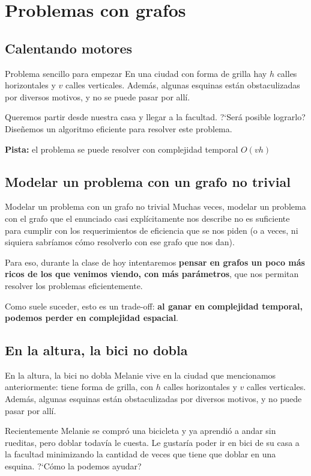 \documentclass[compress]{beamer}
\begin{document}
\section{Problemas con grafos}
\subsection{Calentando motores}
\begin{frame}{Problema sencillo para empezar}
En una ciudad con forma de grilla hay $h$ calles horizontales y $v$ calles verticales. Adem\'as, algunas esquinas est\'an obstaculizadas por diversos motivos, y no se puede pasar por all\'i.\bigskip

Queremos partir desde nuestra casa y llegar a la facultad. ?`Ser\'a posible lograrlo? \\ Dise\~nemos un algoritmo eficiente para resolver este problema. \bigskip

{\bf Pista:} el problema se puede resolver con complejidad temporal $O(v h)$

\end{frame}

\subsection{Modelar un problema con un grafo no trivial}
\begin{frame}{Modelar un problema con un grafo no trivial}
Muchas veces, modelar un problema con el grafo que el enunciado casi expl\'icitamente nos describe no es suficiente para cumplir con los requerimientos de eficiencia que se nos piden (o a veces, ni siquiera sabr\'iamos c\'omo resolverlo con ese grafo que nos dan).\bigskip

Para eso, durante la clase de hoy intentaremos {\bf pensar en grafos un poco m\'as ricos de los que venimos viendo, con m\'as par\'ametros}, que nos permitan resolver los problemas eficientemente. \bigskip

Como suele suceder, esto es un trade-off: {\bf al ganar en complejidad temporal, podemos perder en complejidad espacial}.
\end{frame}

\subsection{En la altura, la bici no dobla}
\begin{frame}{En la altura, la bici no dobla}
Melanie vive en la ciudad que mencionamos anteriormente: tiene forma de grilla, con $h$ calles horizontales y $v$ calles verticales. Adem\'as, algunas esquinas est\'an obstaculizadas por diversos motivos, y no puede pasar por all\'i.\bigskip

Recientemente Melanie se compr\'o una bicicleta y ya aprendi\'o a andar sin rueditas, pero doblar todav\'ia le cuesta. Le gustar\'ia poder ir en bici de su casa a la facultad minimizando la cantidad de veces que tiene que doblar en una esquina.
?`C\'omo la podemos ayudar? \bigskip
\end{frame}
\end{document}
